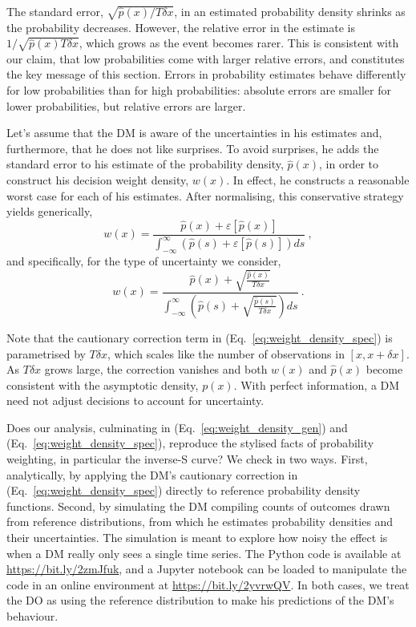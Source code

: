 \documentclass[%
	a4paper,
	abstract=true,	
	12pt,
	numbers=noenddot,
]{scrartcl}
\newcommand{\elabel}[1]{\label{eq:#1}}
\newcommand{\eref}[1]{(Eq.~\ref{eq:#1})}
\newcommand{\be}{\begin{equation}}
\newcommand{\ee}{\end{equation}}
\newcommand{\err}[1]{\varepsilon\left[#1\right]}
\newcommand{\phat}{\hat{p}}
\newcommand{\MK}[1]{\textcolor{red}{\textit{***MK: #1 MK***}}}
\begin{document}
The standard error, $ \sqrt{\phat(x)/T \delta x}$, in an estimated probability density shrinks as the probability decreases. However, the relative error in the estimate is $1/\sqrt{\phat(x)T\delta x}$, which grows as the event becomes rarer. This is consistent with our claim, that low probabilities come with larger relative errors, and constitutes the key message of this section. Errors in probability estimates behave differently for low probabilities than for high probabilities: absolute errors are smaller for lower probabilities, but relative errors are larger.

Let's assume that the DM is aware of the uncertainties in his estimates and, furthermore, that he does not like surprises. To avoid surprises, he adds the standard error to his estimate of the probability density, $\phat(x)$, in order to construct his decision weight density, $w(x)$. In effect, he constructs a reasonable worst case for each of his estimates. After normalising, this conservative strategy yields generically,
\be
w(x) = \frac{\phat(x)+\err{\phat(x)}}{\int_{-\infty}^{\infty}\left(\phat(s)+\err{\phat(s)}\right)ds}~,
\elabel{weight_density_gen}
\ee
and specifically, for the type of uncertainty we consider,
\be
w(x)= \frac{\phat(x)+\sqrt{\frac{\phat(x)}{T \delta x}}}{\int_{-\infty}^{\infty}\left(\phat(s)+\sqrt{\frac{\phat(s)}{T \delta x}}\right)ds}~.
\elabel{weight_density_spec}
\ee

Note that the cautionary correction term in \eref{weight_density_spec} is parametrised by $T\delta x$, which scales like the number of observations in $[x, x+\delta x]$. As $T\delta x$ grows large, the correction vanishes and both $w(x)$ and $\phat(x)$ become consistent with the asymptotic density, $p(x)$. With perfect information, a DM need not adjust decisions to account for uncertainty.

Does our analysis, culminating in \eref{weight_density_gen} and \eref{weight_density_spec}, reproduce the stylised facts of probability weighting, in particular the inverse-S curve? We check in two ways. First, analytically, by applying the DM's cautionary correction in \eref{weight_density_spec} directly to reference probability density functions. Second, by simulating the DM compiling counts of outcomes drawn from reference distributions, from which he estimates probability densities and their uncertainties. The simulation is meant to explore how noisy the effect is when a DM really only sees a single time series. The Python code is available at \url{https://bit.ly/2zmJfuk}, and a Jupyter notebook can be loaded to manipulate the code in an online environment at \url{https://bit.ly/2yvrwQV}. In both cases, we treat the DO as using the reference distribution to make his predictions of the DM's behaviour.
\end{document}
